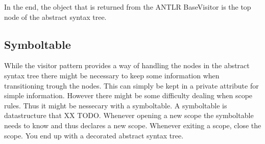 In the end, the object that is returned from the ANTLR BaseVisitor is the top node of the abstract syntax tree.


\subsection{Symboltable}
While the visitor pattern provides a way of handling the nodes in the abstract syntax tree there might be necessary to keep some information when transitioning trough the nodes. This can simply be kept in a private attribute for simple information. However there might be some difficulty dealing when scope rules. Thus it might be nessecary with a symboltable.
A symboltable is datastructure that XX TODO. Whenever opening a new scope the symboltable needs to know and thus declares a new scope. Whenever exiting a scope, close the scope. 
You end up with a decorated abstract syntax tree.


